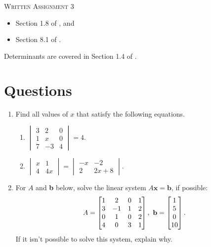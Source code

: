\documentclass{article}
\date{}
\begin{document}
\begin{center}
\textsc{\LARGE Written Assignment 3}\\[0.5cm]
\end{center}
\From 
\begin{itemize}
\item Section 1.8 of \VCT, and 
\item Section 8.1 of \CAT.
\end{itemize}
Determinants are covered in Section 1.4 of \VCT.

\section*{Questions}

\begin{enumerate}
\item

Find all values of $x$ that satisfy the following equations.

\begin{enumerate}
\item \(
 \begin{vmatrix}
  3 &  2 &  0 \\
  1 &  x &  0 \\
  7 & -3 &  4
 \end{vmatrix} = 4.
\)
\item \(
 \begin{vmatrix}
  x & 1 \\
  4 & 4x
 \end{vmatrix} = \begin{vmatrix}
  -x & -2 \\
  2 & 2x + 8
 \end{vmatrix}
\).
\end{enumerate}

\item
For $A$ and \textbf{b} below, solve the linear system $A\mathbf{x} = \mathbf{b}$, if possible:
\begin{align*}
 A = \BM
  1 & 2 & 0 & 1 \\
  3 & -1 & 1 & 2 \\
  0 & 1 & 0 & 2 \\
  4 & 0 & 3 & 1
 \EM, \ 
 \mathbf{b} = \BM 1 \\ 5 \\ 0 \\ 10 \EM.
\end{align*}
 If it isn't possible to solve this system, explain why. 


\end{enumerate}
\end{document}
